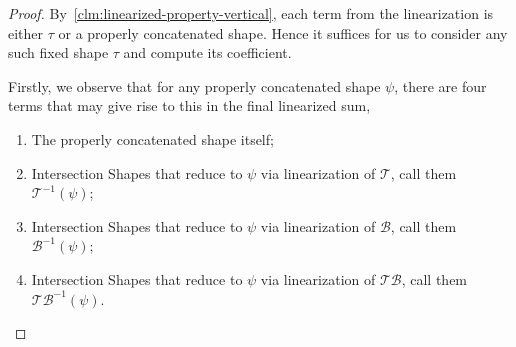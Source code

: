\documentclass[12pt]{article}
\begin{document}
\begin{proof}
	By~\cref{clm:linearized-property-vertical}, each term from the linearization is either $\tau$ or a properly concatenated shape. Hence it suffices for us to consider any such fixed shape $\tau$ and compute its coefficient.

Firstly, we observe that for any properly concatenated shape $\psi$, there are four terms that may give rise to this in the final linearized sum,\begin{enumerate}
	\item The properly concatenated shape itself;
	\item Intersection Shapes that reduce to $\psi$ via linearization of $\mathcal{T}$, call them $\mathcal{T}^{-1}(\psi)$;
	\item Intersection Shapes that reduce to $\psi$ via linearization of $\mathcal{B}$, call them $\mathcal{B}^{-1}(\psi)$;
	\item Intersection Shapes that reduce to $\psi$ via linearization of $\mathcal{TB}$, call them $\mathcal{TB}^{-1}(\psi)$.
\end{enumerate} 


\end{proof}
\end{document}
